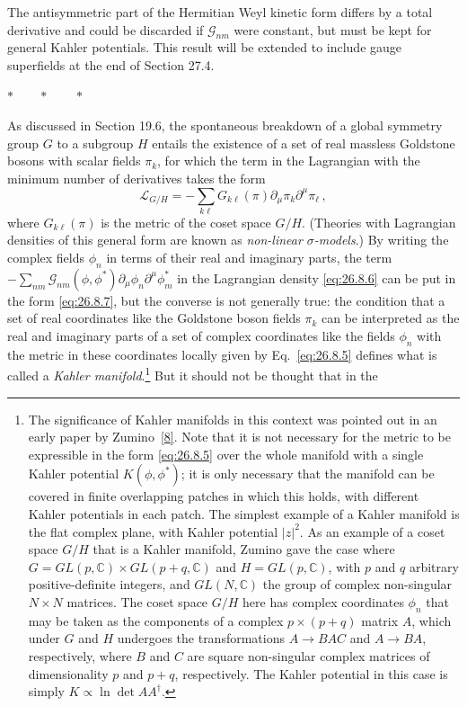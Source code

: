 The antisymmetric part of the Hermitian Weyl kinetic form differs by a total
derivative and could be discarded if \(\mathcal{G}_{nm}\) were constant,
but must be kept for general Kahler potentials. This result will be extended
to include gauge superfields at the end of Section 27.4.

\begin{center}
\(\ast\qquad\ast\qquad\ast\)
\end{center}

As discussed in Section 19.6, the spontaneous breakdown of a global symmetry
group \(G\) to a subgroup \(H\) entails the existence of a set of real
massless Goldstone bosons with scalar fields \(\pi_k\), for which the term in
the Lagrangian with the minimum number of derivatives takes the form
\begin{equation}
  \mathcal{L}_{G/H}
  =-\sum_{k\ell}G_{k\ell}(\pi)
    \partial_\mu\pi_k\partial^\mu\pi_\ell\,,
  \tag{26.8.7}\label{eq:26.8.7}
\end{equation}
where \(G_{k\ell}(\pi)\) is the metric of the coset space \(G/H\). (Theories
with Lagrangian densities of this general form are known as
\textit{non-linear \(\sigma\)-models}.) By writing the complex fields
\(\phi_n\) in terms of their real and imaginary parts, the term
\(-\sum_{nm}\mathcal{G}_{nm}(\phi,\phi^*)
\partial_\mu\phi_n\partial^\mu\phi_m^*\) in the Lagrangian density
\eqref{eq:26.8.6} can be put in the form \eqref{eq:26.8.7}, but the converse
is not generally true: the condition that a set of real coordinates like the
Goldstone boson fields \(\pi_k\) can be interpreted as the real and imaginary
parts of a set of complex coordinates like the fields \(\phi_n\) with the
metric in these coordinates locally given by Eq.~\eqref{eq:26.8.5} defines
what is called a \textit{Kahler manifold}.\footnote{The significance of
Kahler manifolds in this context was pointed out in an early paper by
Zumino~\hyperref[ch26-ref-8]{[8]}. Note that it is not necessary for the
metric to be expressible in the form \eqref{eq:26.8.5} over the whole
manifold with a single Kahler potential \(K(\phi,\phi^*)\); it is only
necessary that the manifold can be covered in finite overlapping patches in
which this holds, with different Kahler potentials in each patch. The
simplest example of a Kahler manifold is the flat complex plane, with Kahler
potential \(\lvert z\rvert^2\). As an example of a coset space \(G/H\) that
is a Kahler manifold, Zumino gave the case where
\(G=GL(p,\mathbb{C})\times GL(p+q,\mathbb{C})\) and
\(H=GL(p,\mathbb{C})\), with \(p\) and \(q\) arbitrary positive-definite
integers, and \(GL(N,\mathbb{C})\) the group of complex non-singular
\(N\times N\) matrices. The coset space \(G/H\) here has complex coordinates
\(\phi_n\) that may be taken as the components of a complex
\(p\times(p+q)\) matrix \(A\), which under \(G\) and \(H\) undergoes the
transformations \(A\to BAC\) and \(A\to BA\), respectively, where \(B\) and
\(C\) are square non-singular complex matrices of dimensionality \(p\) and
\(p+q\), respectively. The Kahler potential in this case is simply
\(K\propto\ln\det AA^\dagger\).} But it should not be thought that in the
